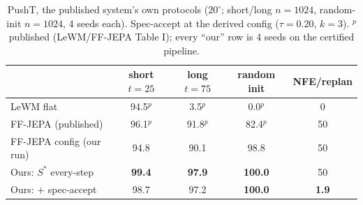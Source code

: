 \documentclass{article}
\newcommand{\ours}[1]{\textbf{#1}}
\newcommand{\degc}[1]{$#1^\circ$}
\begin{document}
\begin{table}[h]
\centering
\small
\caption{PushT, the published system's own protocols (\degc{20}; short/long
$n{=}1024$, random-init $n{=}1024$, 4 seeds each). Spec-accept at the derived config
($\tau{=}0.20$, $k{=}3$). $^{p}$published (LeWM/FF-JEPA Table I); every ``our'' row is
4 seeds on the certified pipeline.}
\label{tab:headline2}
\begin{tabular}{lcccc}
\toprule
& short $t{=}25$ & long $t{=}75$ & random init & NFE/replan \\
\midrule
LeWM flat                    & 94.5$^{p}$ & 3.5$^{p}$ & 0.0$^{p}$ & 0 \\
FF-JEPA (published)          & 96.1$^{p}$ & 91.8$^{p}$ & 82.4$^{p}$ & 50 \\
FF-JEPA config (our run)     & 94.8 & 90.1 & 98.8 & 50 \\
Ours: $S^{*}$ every-step     & \ours{99.4} & \ours{97.9} & \ours{100.0} & 50 \\
Ours: $+$ spec-accept        & 98.7 & 97.2 & \ours{100.0} & \ours{1.9} \\
\bottomrule
\end{tabular}
\end{table}
\end{document}
